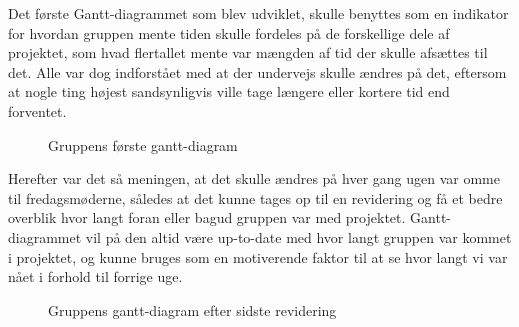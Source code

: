 \vspace{5mm}

 Det første Gantt-diagrammet som blev udviklet, skulle benyttes som en indikator for hvordan gruppen mente tiden skulle fordeles på de forskellige dele af projektet, som hvad flertallet mente var mængden af tid der skulle afsættes til det. Alle var dog indforstået med at der undervejs skulle ændres på det, eftersom at nogle ting højest sandsynligvis ville tage længere eller kortere tid end forventet.

\begin{figure}[H]
    \centering
    \caption{Gruppens første gantt-diagram}
    \label{Gantt-diagram-first}
\end{figure}

Herefter var det så meningen, at det skulle ændres på hver gang ugen var omme til fredagsmøderne, således at det kunne tages op til en revidering og få et bedre overblik hvor langt foran eller bagud gruppen var med projektet. Gantt-diagrammet vil på den altid være up-to-date med hvor langt gruppen var kommet i projektet, og kunne bruges som en motiverende faktor til at se hvor langt vi var nået i forhold til forrige uge.

\begin{figure}[H]
    \centering
    \caption{Gruppens gantt-diagram efter sidste revidering}
    \label{Gantt-diagram-picture}
\end{figure}

